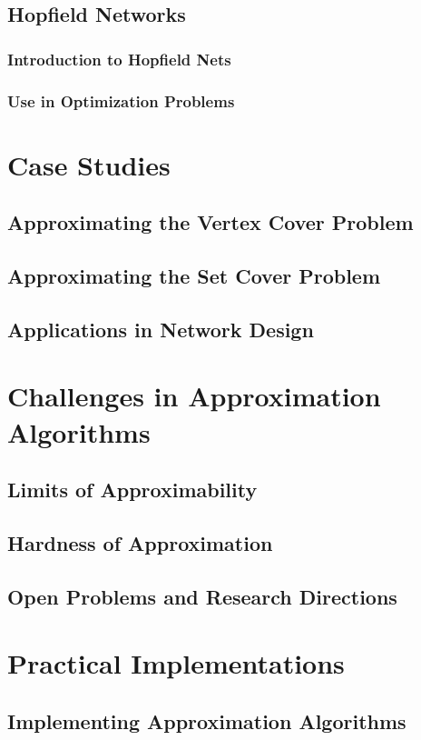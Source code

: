 \documentclass[12pt]{book} %
\begin{document}
\subsection{Hopfield Networks}
\subsubsection{Introduction to Hopfield Nets}
\subsubsection{Use in Optimization Problems}

\section{Case Studies}
\subsection{Approximating the Vertex Cover Problem}
\subsection{Approximating the Set Cover Problem}
\subsection{Applications in Network Design}

\section{Challenges in Approximation Algorithms}
\subsection{Limits of Approximability}
\subsection{Hardness of Approximation}
\subsection{Open Problems and Research Directions}

\section{Practical Implementations}
\subsection{Implementing Approximation Algorithms}
\end{document}
